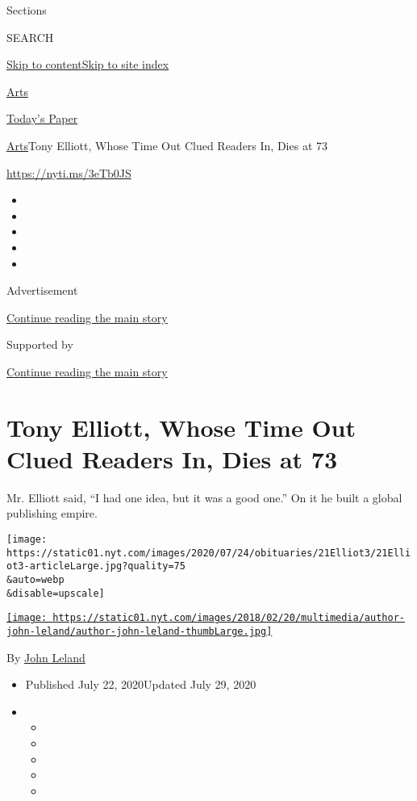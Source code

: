 Sections

SEARCH

\protect\hyperlink{site-content}{Skip to
content}\protect\hyperlink{site-index}{Skip to site index}

\href{https://www.nytimes.com/section/arts}{Arts}

\href{https://myaccount.nytimes.com/auth/login?response_type=cookie\&client_id=vi}{}

\href{https://www.nytimes.com/section/todayspaper}{Today's Paper}

\href{/section/arts}{Arts}\textbar{}Tony Elliott, Whose Time Out Clued
Readers In, Dies at 73

\url{https://nyti.ms/3eTb0JS}

\begin{itemize}
\item
\item
\item
\item
\item
\end{itemize}

Advertisement

\protect\hyperlink{after-top}{Continue reading the main story}

Supported by

\protect\hyperlink{after-sponsor}{Continue reading the main story}

\hypertarget{tony-elliott-whose-time-out-clued-readers-in-dies-at-73}{%
\section{Tony Elliott, Whose Time Out Clued Readers In, Dies at
73}\label{tony-elliott-whose-time-out-clued-readers-in-dies-at-73}}

Mr. Elliott said, ``I had one idea, but it was a good one.'' On it he
built a global publishing empire.

\texttt{[image: https://static01.nyt.com/images/2020/07/24/obituaries/21Elliot3/21Elliot3-articleLarge.jpg?quality=75\\\&auto=webp\\\&disable=upscale]}

\href{https://www.nytimes.com/by/john-leland}{\texttt{[image: https://static01.nyt.com/images/2018/02/20/multimedia/author-john-leland/author-john-leland-thumbLarge.jpg]}}

By \href{https://www.nytimes.com/by/john-leland}{John Leland}

\begin{itemize}
\item
  Published July 22, 2020Updated July 29, 2020
\item
  \begin{itemize}
  \item
  \item
  \item
  \item
  \item
  \end{itemize}
\end{itemize}


